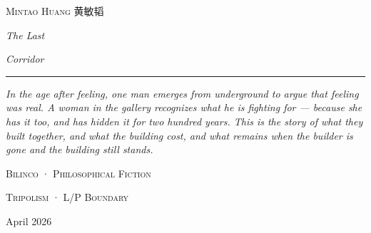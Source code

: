 \thispagestyle{empty}
\vspace*{4cm}
\begin{center}
{\footnotesize\color{dim}\textsc{Mintao Huang \enspace 黄敏韬}}\par
\vspace{4em}
{\Huge\itshape The Last}\par
\vspace{0.3em}
{\Huge\itshape Corridor}\par
\vspace{2em}
{\color{rule}\rule{10em}{0.5pt}}\par
\vspace{1.6em}
\begin{minipage}{0.78\textwidth}\centering\itshape\small
In the age after feeling, one man emerges from underground to argue that feeling was real. A woman in the gallery recognizes what he is fighting for — because she has it too, and has hidden it for two hundred years. This is the story of what they built together, and what the building cost, and what remains when the builder is gone and the building still stands.
\end{minipage}\par
\end{center}
\vfill
\begin{center}
{\footnotesize\color{dim}\textsc{Bilinco \enspace · \enspace Philosophical Fiction}}\par
\vspace{0.4em}
{\footnotesize\color{dim}\textsc{Tripolism \enspace · \enspace L/P Boundary}}\par
\vspace{0.6em}
{\footnotesize\color{dim} April 2026}\par
\end{center}
